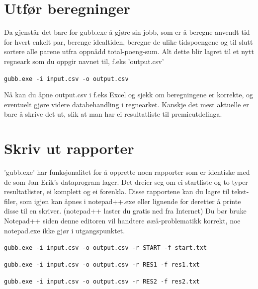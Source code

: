 \documentclass[12pt]{book}
\begin{document}
\newpage

\section{Utfør beregninger}

Da gjenstår det bare for gubb.exe å gjøre sin jobb, som er å beregne anvendt tid for hvert enkelt par, berenge idealtiden, beregne de ulike tidspoengene og til slutt sortere alle parene utfra oppnådd total-poeng-sum. Alt dette blir lagret til et nytt regneark som du oppgir navnet til, f.eks 'output.csv'

\begin{alltt}
\texttt{gubb.exe -i input.csv -o output.csv  {\Return} }
\end{alltt}

Nå kan du åpne output.csv i f.eks Excel og sjekk om beregningene er korrekte, og eventuelt gjøre videre databehandling i regnearket. Kanskje det mest aktuelle er bare å skrive det ut, slik at man har ei resultatliste til premieutdelinga.

\section{Skriv ut rapporter}

'gubb.exe' har funksjonalitet for å opprette noen rapporter som er identiske med de som Jan-Erik's dataprogram lager. Det dreier seg om ei startliste og to typer resultatlister, ei komplett og ei forenkla. Disse rapportene kan du lagre til tekst-filer, som igjen kan åpnes i notepad++.exe eller lignende for deretter å printe disse til en skriver. (notepad++ laster du gratis ned fra Internet) Du bør bruke Notepad++ siden denne editoren vil handtere øæå-problematikk korrekt, noe notepad.exe ikke gjør i utgangspunktet.


\begin{alltt}
\texttt{gubb.exe -i input.csv -o output.csv -r START -f start.txt  {\Return} }

\texttt{gubb.exe -i input.csv -o output.csv -r RES1 -f res1.txt  {\Return} }

\texttt{gubb.exe -i input.csv -o output.csv -r RES2 -f res2.txt  {\Return} }
\end{alltt}
\end{document}

